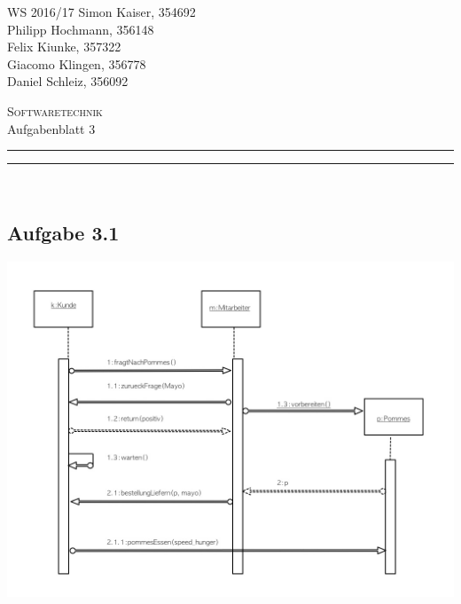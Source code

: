 \documentclass[a4paper,graphics,11pt]{article}
\newcommand\aufgabe[1]{\subsection*{Aufgabe #1}}
\newcommand\aufgabenteil[1]{\subsubsection*{#1}}
\begin{document}
\noindent WS 2016/17        \hfill Simon Kaiser, 354692 \\
\null                                     \hfill Philipp Hochmann, 356148 \\
\null                                     \hfill Felix Kiunke, 357322 \\
\null                                     \hfill Giacomo Klingen, 356778 \\
\null                                     \hfill Daniel Schleiz, 356092 \\

\begin{center}
\Large \textsc{Softwaretechnik} \\   %
\large Aufgabenblatt 3                        %
\end{center}
\begin{center}
\rule[0.5ex]{\textwidth}{0.6pt}\vspace*{-\baselineskip}\vspace{3.2pt}
\rule[0.5ex]{\textwidth}{1.6pt}\\
\end{center}

%
% 

\aufgabe{3.1}

\includegraphics[width=1\textwidth]{SWT31}
\end{document}
